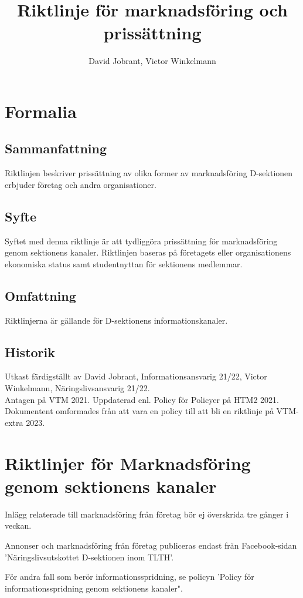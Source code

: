 \documentclass{dsekprotokoll}
\title{Riktlinje för marknadsföring och prissättning}
\author{David Jobrant, Victor Winkelmann}
\begin{document}
\maketitle
\section{Formalia}
\subsection{Sammanfattning}
Riktlinjen beskriver prissättning av olika former av marknadsföring D-sektionen erbjuder företag och andra organisationer.

\subsection{Syfte}
Syftet med denna riktlinje är att tydliggöra prissättning för marknadsföring genom sektionens kanaler. Riktlinjen baseras på företagets eller organisationens ekonomiska status samt studentnyttan för sektionens medlemmar.

\subsection{Omfattning}
Riktlinjerna är gällande för D-sektionens informationskanaler.

\subsection{Historik}
Utkast färdigställt av David Jobrant, Informationsansvarig 21/22, Victor Winkelmann, Näringslivsansvarig 21/22. \\
Antagen på VTM 2021.
Uppdaterad enl. Policy för Policyer på HTM2 2021. Dokumentent omformades från att vara en policy till att bli en riktlinje på VTM-extra 2023.

\section{Riktlinjer för Marknadsföring genom sektionens kanaler}
Inlägg relaterade till marknadsföring från företag bör ej överskrida tre gånger i veckan.

Annonser och marknadsföring från företag publiceras endast från Facebook-sidan 'Näringslivsutskottet D-sektionen inom TLTH'.

För andra fall som berör informationsspridning, se policyn 'Policy för informationsspridning genom sektionens kanaler".
\end{document}
